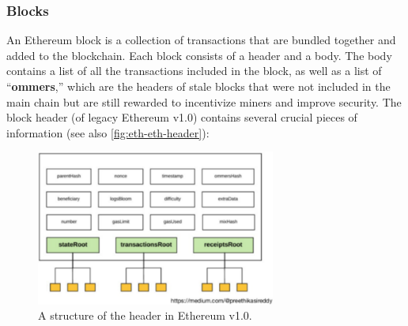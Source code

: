 \subsubsection{Blocks}\label{blocks}

An Ethereum block is a collection of transactions that are bundled
together and added to the blockchain. Each block consists of a header
and a body. The body contains a list of all the transactions included in
the block, as well as a list of ``\textbf{ommers},'' which are the
headers of stale blocks that were not included in the main chain but are
still rewarded to incentivize miners and improve security.
The block header (of legacy Ethereum v1.0) contains several crucial pieces of information (see also \autoref{fig:eth-eth-header}):

\begin{figure}[t]
	\begin{center}
		\includegraphics[width=0.7\textwidth]{./figs/eth-block.png}
		\caption{A structure of the header in Ethereum v1.0.}		
		\label{fig:eth-eth-header}
	\end{center}	
\end{figure}


